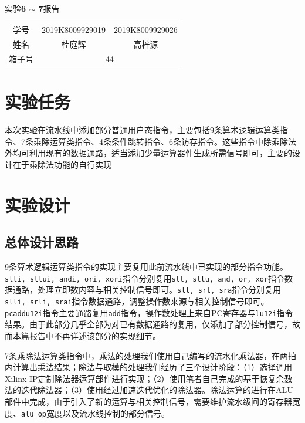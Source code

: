 \documentclass[UTF-8,twoside,c5size]{ctexart}
\begin{document}
	\begin{center}
		\heiti{}
		实验\textbf{6 $ \bm\sim $ 7}报告
	\end{center}

	\begin{table}[!h]
		\raggedleft
		\begin{tabular}{ccc}
			{\heiti 学号} & {2019K8009929019} & {2019K8009929026} \\
			{\heiti 姓名} & 桂庭辉 & 高梓源 \\
			{\heiti 箱子号} & \multicolumn{2}{c}{44}
		\end{tabular}
	\end{table}
	
	\section{实验任务}
	
	本次实验在流水线中添加部分普通用户态指令，主要包括9条算术逻辑运算类指令、7条乘除运算类指令、4条条件跳转指令、6条访存指令。这些指令中除乘除法外均可利用现有的数据通路，适当添加少量运算器件生成所需信号即可，主要的设计在于乘除法功能的自行实现
	
	\section{实验设计}	
	
	\subsection{总体设计思路}
	
	9条算术逻辑运算类指令的实现主要复用此前流水线中已实现的部分指令功能。\texttt{slti, sltui, andi, ori, xori}指令分别复用\texttt{slt, sltu, and, or, xor}指令数据通路，处理立即数内容与相关控制信号即可。\texttt{sll, srl, sra}指令分别复用\texttt{slli, srli, srai}指令数据通路，调整操作数来源与相关控制信号即可。\texttt{pcaddu12i}指令主要通路复用\texttt{add}指令，操作数处理上来自PC寄存器与\texttt{lu12i}指令结果。由于此部分几乎全部为对已有数据通路的复用，仅添加了部分控制信号，故而本篇报告中不再详述该部分的实现细节。
	
	7条乘除法运算类指令中，乘法的处理我们使用自己编写的流水化乘法器，在两拍内计算出乘法结果；除法与取模的处理我们经历了三个设计阶段：（1）选择调用Xilinx IP定制除法器运算部件进行实现；（2）使用笔者自己完成的基于恢复余数法的迭代除法器；（3）使用经过加速迭代优化的除法器。除法运算的进行在ALU部件中完成，由于引入了新的运算与相关控制信号，需要维护流水级间的寄存器宽度、\texttt{alu\_op}宽度以及流水线控制的部分信号。
	
\end{document}
